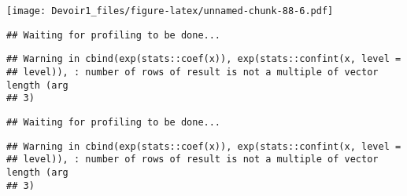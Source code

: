 \documentclass[]{article}
\newenvironment{Shaded}{\begin{snugshade}}{\end{snugshade}}
\newcommand{\KeywordTok}[1]{\textcolor[rgb]{0.13,0.29,0.53}{\textbf{#1}}}
\newcommand{\DataTypeTok}[1]{\textcolor[rgb]{0.13,0.29,0.53}{#1}}
\newcommand{\DecValTok}[1]{\textcolor[rgb]{0.00,0.00,0.81}{#1}}
\newcommand{\StringTok}[1]{\textcolor[rgb]{0.31,0.60,0.02}{#1}}
\newcommand{\OperatorTok}[1]{\textcolor[rgb]{0.81,0.36,0.00}{\textbf{#1}}}
\newcommand{\NormalTok}[1]{#1}
\begin{document}
\texttt{[image: Devoir1\_files/figure-latex/unnamed-chunk-88-6.pdf]}

\begin{Shaded}
\end{Shaded}

\begin{verbatim}
## Waiting for profiling to be done...
\end{verbatim}

\begin{verbatim}
## Warning in cbind(exp(stats::coef(x)), exp(stats::confint(x, level =
## level)), : number of rows of result is not a multiple of vector length (arg
## 3)
\end{verbatim}

\begin{verbatim}
## Waiting for profiling to be done...
\end{verbatim}

\begin{verbatim}
## Warning in cbind(exp(stats::coef(x)), exp(stats::confint(x, level =
## level)), : number of rows of result is not a multiple of vector length (arg
## 3)
\end{verbatim}
\end{document}
